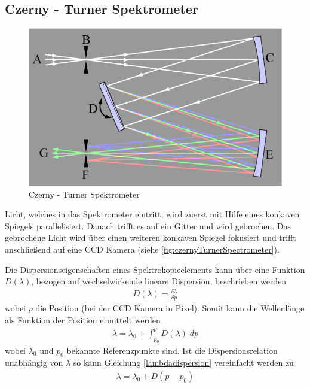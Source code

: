 \documentclass[11pt,a4paper]{article}
\begin{document}
\subsection{Czerny - Turner Spektrometer}
\begin{figure}[h]
	\centering
	\includegraphics[scale=0.5]{czernyTurnerSpectrometer_Wikipedia.png}
	\caption{Czerny - Turner Spektrometer}\label{fig:czernyTurnerSpectrometer}
\end{figure}

Licht, welches in das Spektrometer eintritt, wird zuerst mit Hilfe eines konkaven Spiegels parallelisiert. Danach trifft es auf ein Gitter und wird gebrochen. Das gebrochene Licht wird über einen weiteren konkaven Spiegel fokusiert und trifft anschließend auf eine CCD Kamera (siehe \autoref{fig:czernyTurnerSpectrometer}).

Die Dispersionseigenschaften eines Spektrokopieelements kann über eine Funktion $D(\lambda)$, bezogen auf wechselwirkende lineare Dispersion, beschrieben werden
\begin{align}
	D(\lambda) = \frac{\delta \lambda}{\delta p}
\end{align}
wobei $p$ die Position (bei der CCD Kamera in Pixel). Somit kann die Wellenlänge als Funktion der Position ermittelt werden
\begin{align}
	\lambda = \lambda_0 + \int_{p_0}^{p} D(\lambda) \; dp \label{lambdadispersion}
\end{align}
wobei $\lambda_0$ und $p_0$ bekannte Referenzpunkte sind. Ist die Dispersionsrelation unabhängig von $\lambda$ so kann Gleichung \eqref{lambdadispersion} vereinfacht werden zu
\begin{align}
	\lambda = \lambda_0 + D(p - p_0)
\end{align}
\end{document}
